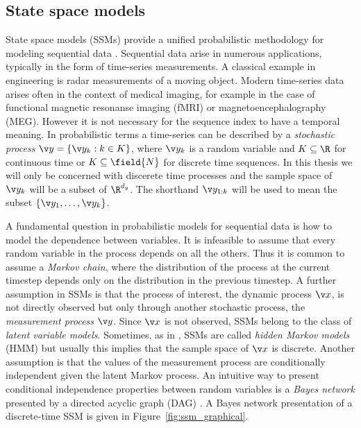 \subsection{State space models}

State space models (SSMs) provide a unified probabilistic methodology for modeling
sequential data \parencite{ljung1994modeling,durbin2012time,Cappe2005,barber2011bayesian}. Sequential data arise in numerous applications, 
typically in the form of time-series measurements. A classical example in engineering is radar measurements
of a moving object. Modern time-series data arises often in the context of medical imaging,
for example in the case of functional magnetic resonanse imaging (fMRI) or magnetoencephalography (MEG).
However it is not necessary for the sequence index to have
a temporal meaning. In probabilistic terms a time-series
can be described by a \emph{stochastic process} $\y = \left\{\y_k:k\in K\right\}$, where $\y_k$ is a random
variable and $K\subseteq\R$ for continuous time or $K\subseteq\field{N}$ for discrete time sequences. 
In this thesis we will only be concerned with discerete time processes and the sample space of $\y_k$ will be
a subset of $\R^{d_y}$.
The shorthand $\y_{1:k}$ will be used to mean the subset $\{\y_1,\dots,\y_k\}$. 

A fundamental question in probabilistic models for sequential data is how 
to model the dependence between variables. It is infeasible to assume
that every random variable in the process depends on all the others.
Thus it is common to assume a \emph{Markov chain}, where the distribution of
the process at the current timestep depends only on the distribution in the previous timestep.
A further assumption in SSMs is that the process of interest, the dynamic process $\x$, is not directly observed
but only through another stochastic process, the \emph{measurement process} $\y$. Since
$\x$ is not observed, SSMs belong to the class of \emph{latent variable models}. Sometimes, as in
\textcite{Cappe2005}, SSMs are called \emph{hidden Markov models} (HMM) but usually this implies that
the sample space of $\x$ is discrete. Another assumption is that the values of the measurement process are conditionally independent
given the latent Markov process.
An intuitive way to present conditional independence properties between random
variables is a \emph{Bayes network} presented by a directed acyclic graph (DAG) \parencite{pearl1988probabilistic,Bishop2006}.
A Bayes network presentation of a discrete-time SSM is given in Figure~\ref{fig:ssm_graphical}.

